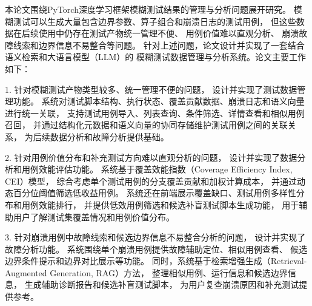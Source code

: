 
\begin{cabstract}

本论文围绕PyTorch深度学习框架模糊测试结果的管理与分析问题展开研究。
模糊测试可以生成大量包含边界参数、算子组合和崩溃日志的测试用例，
但这些数据在后续使用中仍存在测试产物统一管理不便、
用例价值难以直观分析、
崩溃故障线索和边界信息不易整合等问题。
针对上述问题，论文设计并实现了一套结合语义检索和大语言模型（LLM）的
模糊测试数据管理与分析系统。论文主要工作如下：

1. 针对模糊测试产物类型较多、统一管理不便的问题，
设计并实现了测试数据管理功能。
系统对测试脚本结构、执行状态、覆盖贡献数据、崩溃日志和语义向量进行统一关联，
支持测试用例导入、列表查询、条件筛选、详情查看和相似用例召回，
并通过结构化元数据和语义向量的协同存储维护测试用例之间的关联关系，
为后续数据分析和故障分析提供基础。

2. 针对用例价值分布和补充测试方向难以直观分析的问题，
设计并实现了数据分析和用例效能评估功能。
系统基于覆盖效能指数（Coverage Efficiency Index, CEI）模型，
综合考虑单个测试用例的分支覆盖贡献和加权计算成本，
并通过动态百分位阈值筛选低收益用例。
系统还在前端展示覆盖缺口、测试用例多样性分布和用例效能排行，
并提供低效用例筛选和候选补盲测试脚本生成功能，
用于辅助用户了解测试集覆盖情况和用例价值分布。

3. 针对崩溃用例中故障线索和候选边界信息不易整合分析的问题，
设计并实现了故障分析功能。
系统围绕单个崩溃用例提供故障辅助定位、相似用例查看、
候选边界条件提示和边界对比展示等功能。
同时，系统基于检索增强生成（Retrieval-Augmented Generation, RAG）方法，
整理相似用例、运行信息和候选边界信息，
生成辅助诊断报告和候选补盲测试脚本，
为用户复查崩溃原因和补充测试提供参考。

\end{cabstract}

